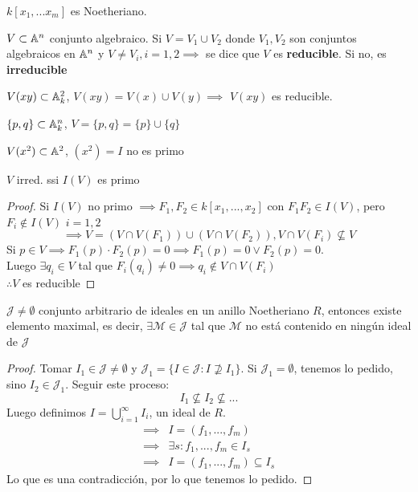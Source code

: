 \begin{cor}
    $k[x_1,...x_m]$ es Noetheriano.
\end{cor}

\begin{defn}
    $V\subset\mathbb{A}^n$ conjunto algebraico. Si $V=V_1\cup V_2$ donde $V_1,V_2$ son conjuntos algebraicos en $\mathbb{A}^n$ y $V\neq V_i, i=1,2\implies$ se dice que $V$ es \textbf{reducible}. Si no, es \textbf{irreducible}
\end{defn}

\begin{ejm}
    $V(xy)\subset\mathbb{A}^2_k$, $V(xy)=V(x)\cup V(y)\implies$ $V(xy)$  es reducible.
\end{ejm}
\begin{ejm}
    $\{p,q\}\subset\mathbb{A}_k^n$, $V=\{p,q\}=\{p\}\cup\{q\}$
\end{ejm}
\begin{ejm}
    $V(x^2)\subset\mathbb{A}^2$, $(x^2)=I$ no es primo
\end{ejm}

\begin{prop}
    $V$ irred. ssi $I(V)$ es primo
\end{prop}
\begin{proof}
    Si $I(V)$ no primo $\implies F_1,F_2\in k[x_1,...,x_2]$ con $F_1F_2\in I(V)$, pero $F_i\notin I(V)$ $i=1,2$
    \[
        \implies V=(V\cap V(F_1))\cup(V\cap V(F_2)), V\cap V(F_i)\nsubseteq V
    \]
    Si $p\in V\implies F_1(p)\cdot F_2(p)=0\implies F_1(p)=0\vee F_2(p)=0$.\\
    Luego $\exists q_i\in V$ tal que $F_i(q_i)\neq 0\implies q_i\notin V\cap V(F_i)$\\
    $\therefore V$ es reducible
\end{proof}

\begin{lem}
    $\mathcal{J}\neq\emptyset$ conjunto arbitrario de ideales en un anillo Noetheriano $R$, entonces existe elemento maximal, es decir, $\exists\mathcal{M}\in\mathcal{J}$ tal que $\mathcal{M}$ no está contenido en ningún ideal de $
        \mathcal{J}$
\end{lem}
\begin{proof}
    Tomar $I_1\in\mathcal{J}\neq\emptyset$ y $\mathcal{J}_1=\{I\in\mathcal{J}:I\nsupseteq I_1\}$. Si $\mathcal{J}_1=\emptyset$, tenemos lo pedido, sino $I_2\in\mathcal{J}_1$. Seguir este proceso:
    \[
        I_1\nsubseteq I_2\nsubseteq ...
    \]
    Luego definimos $I=\bigcup_{i=1}^\infty I_i$, un ideal de $R$.
    \begin{align*}
        \implies & I=(f_1,...,f_m)               \\
        \implies & \exists s: f_1,...,f_m\in I_s \\
        \implies & I=(f_1,...,f_m)\subseteq I_s
    \end{align*}
    Lo que es una contradicción, por lo que tenemos lo pedido.
\end{proof}

